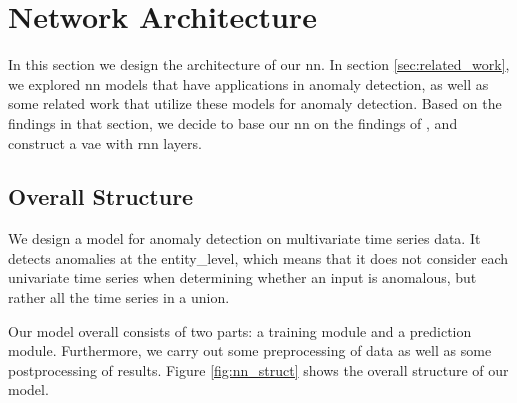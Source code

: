 \section{Network Architecture}
In this section we design the architecture of our \gls{nn}. In section \ref{sec:related_work}, we explored \gls{nn} models that have applications in anomaly detection, as well as some related work that utilize these models for anomaly detection. Based on the findings in that section, we decide to base our \gls{nn} on the findings of \cite{kdd}, and construct a \gls{vae} with \gls{rnn} layers.

\subsection{Overall Structure}
We design a model for anomaly detection on multivariate time series data. It detects anomalies at the \gls{entity_level}, which means that it does not consider each univariate time series when determining whether an input is anomalous, but rather all the time series in a union.

Our model overall consists of two parts: a training module and a prediction module. Furthermore, we carry out some preprocessing of data as well as some postprocessing of results. Figure \ref{fig:nn_struct} shows the overall structure of our model.

